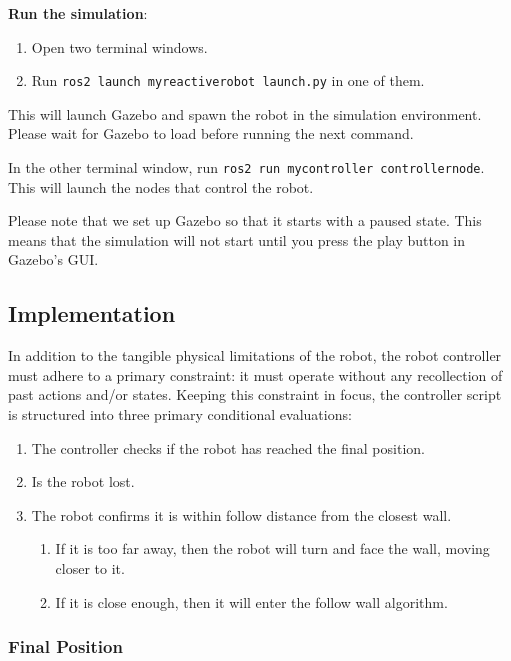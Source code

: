 \documentclass[conference]{IEEEtran}
\begin{document}
\vskip 0.1in

\textbf{Run the simulation}:

\begin{enumerate}
    \item Open two terminal windows.
    \item Run \texttt{ros2 launch my\textunderscore reactive\textunderscore robot launch.py} in one of them.
\end{enumerate}

This will launch Gazebo and spawn the robot in the simulation environment. Please wait for Gazebo to load before running the next command.

In the other terminal window, run \texttt{ros2 run my\textunderscore controller controller\textunderscore node}.
This will launch the nodes that control the robot.

\vskip 0.1in

Please note that we set up Gazebo so that it starts with a paused state. This means that the simulation will not start
until you press the play button in Gazebo's GUI.

\subsection{Implementation}

In addition to the tangible physical limitations of the robot, the robot controller must adhere to a primary constraint: it must operate without any recollection of past actions and/or states. Keeping this constraint in focus, the controller script is structured into three primary conditional evaluations:
\begin{enumerate}
    \item The controller checks if the robot has reached the final position.  
    \item Is the robot lost.
    \item The robot confirms it is within follow distance from the closest wall.
    \begin{enumerate}
        \item If it is too far away, then the robot will turn and face the wall, moving closer to it.
        \item If it is close enough, then it will enter the follow wall algorithm.
    \end{enumerate}
\end{enumerate}

\subsubsection{Final Position}
\end{document}
